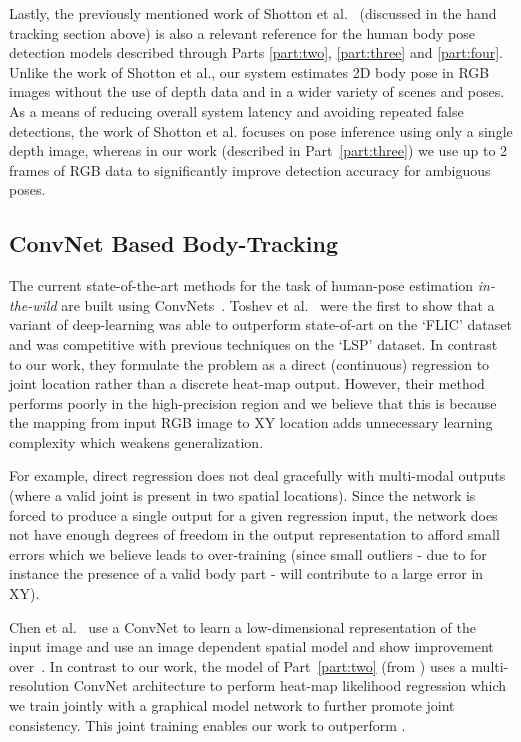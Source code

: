 Lastly, the previously mentioned work of Shotton et al.~\cite{shotton2013real} (discussed in the hand tracking section above) is also a relevant reference for the human body pose detection models described through Parts \ref{part:two}, \ref{part:three} and \ref{part:four}. Unlike the work of Shotton et al., our system estimates 2D body pose in RGB images without the use of depth data and in a wider variety of scenes and poses. As a means of reducing overall system latency and avoiding repeated false detections, the work of Shotton et al. focuses on pose inference using only a single depth image, whereas in our work (described in Part~\ref{part:three}) we use up to 2 frames of RGB data to significantly improve detection accuracy for ambiguous poses.

\subsection*{ConvNet Based Body-Tracking}

The current state-of-the-art methods for the task of human-pose estimation \emph{in-the-wild} are built using ConvNets~\cite{deeppose, jainiclr2014, tompsonnips2014, arjunaccv2014, chennips2014}.  Toshev et al.~\cite{deeppose} were the first to show that a variant of deep-learning was able to outperform state-of-art on the `FLIC' \cite{modec} dataset and was competitive with previous techniques on the `LSP' \cite{Johnson10} dataset. In contrast to our work, they formulate the problem as a direct (continuous) regression to joint location rather than a discrete heat-map output. However, their method performs poorly in the high-precision region and we believe that this is because the mapping from input RGB image to XY location adds unnecessary learning complexity which weakens generalization.

For example, direct regression does not deal gracefully with multi-modal outputs (where a valid joint is present in two spatial locations). Since the network is forced to produce a single output for a given regression input, the network does not have enough degrees of freedom in the output representation to afford small errors which we believe leads to over-training (since small outliers - due to for instance the presence of a valid body part - will contribute to a large error in XY).

Chen et al.~\cite{chennips2014} use a ConvNet to learn a low-dimensional representation of the input image and use an image dependent spatial model and show improvement over~\cite{deeppose}. In contrast to our work, the model of Part~\ref{part:two} (from \cite{tompsonnips2014, arjunaccv2014}) uses a multi-resolution ConvNet architecture to perform heat-map likelihood regression which we train jointly with a graphical model network to further promote joint consistency. This joint training enables our work to outperform \cite{chennips2014}.

